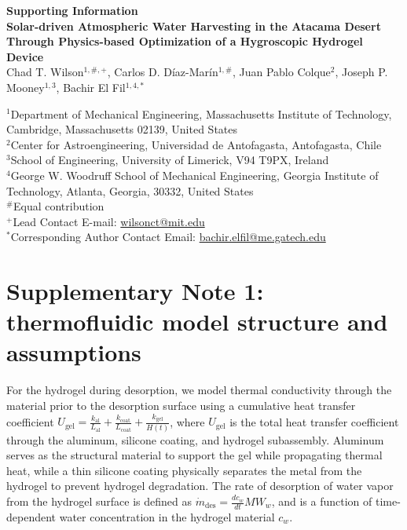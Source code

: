 \documentclass[11pt]{article}
\begin{document}
\vspace{1em}

\begin{center}
{\large\bfseries Supporting Information}\\[0.5em]
{\large\bfseries Solar-driven Atmospheric Water Harvesting in the Atacama Desert Through Physics-based Optimization of a Hygroscopic Hydrogel Device}\\[0.8em]
Chad T. Wilson$^{1,\#,+}$, Carlos D. Díaz-Marín$^{1,\#}$, Juan Pablo Colque$^{2}$, Joseph P. Mooney$^{1,3}$, Bachir El Fil$^{1,4,*}$
\end{center}

\noindent
$^{1}$Department of Mechanical Engineering, Massachusetts Institute of Technology, Cambridge, Massachusetts 02139, United States\\
$^{2}$Center for Astroengineering, Universidad de Antofagasta, Antofagasta, Chile\\
$^{3}$School of Engineering, University of Limerick, V94 T9PX, Ireland\\
$^{4}$George W. Woodruff School of Mechanical Engineering, Georgia Institute of Technology, Atlanta, Georgia, 30332, United States\\
$^{\#}$Equal contribution\\
$^{+}$Lead Contact E-mail: \href{mailto:wilsonct@mit.edu}{wilsonct@mit.edu}\\
$^{*}$Corresponding Author Contact Email: \href{mailto:bachir.elfil@me.gatech.edu}{bachir.elfil@me.gatech.edu}

\section{Supplementary Note 1: thermofluidic model structure and assumptions}

For the hydrogel during desorption, we model thermal conductivity through the material prior to the desorption surface using a cumulative heat transfer coefficient $U_{\mathrm{gel}} = \frac{k_{\mathrm{al}}}{L_{\mathrm{al}}} + \frac{k_{\mathrm{coat}}}{L_{\mathrm{coat}}} + \frac{k_{\mathrm{gel}}}{H(t)}$, where $U_{\mathrm{gel}}$ is the total heat transfer coefficient through the aluminum, silicone coating, and hydrogel subassembly. Aluminum serves as the structural material to support the gel while propagating thermal heat, while a thin silicone coating physically separates the metal from the hydrogel to prevent hydrogel degradation. The rate of desorption of water vapor from the hydrogel surface is defined as $\dot{m}_{\mathrm{des}} = \frac{dc_{w}}{dt}MW_{w}$, and is a function of time-dependent water concentration in the hydrogel material $c_{w}$.
\end{document}
